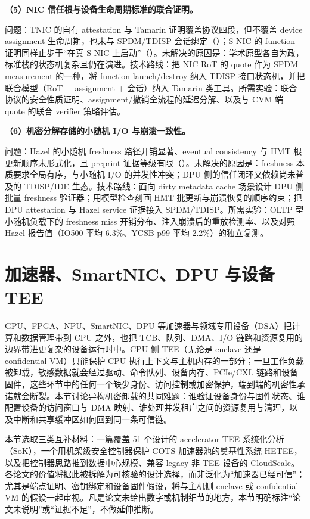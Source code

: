 \documentclass[11pt]{ctexart}
\begin{document}
\noindent\textbf{（5）NIC 信任根与设备生命周期标准的联合证明。}\par
问题：TNIC 的自有 attestation 与 Tamarin 证明覆盖协议四段，但不覆盖 device assignment 生命周期，也未与 SPDM/TDISP 会话绑定（\cite{giantsidi2025tnic}）；S-NIC 的 function 证明同样止步于“在真 S-NIC 上启动”（\cite{zhou2024snic}）。未解决的原因是：学术原型各自为政，标准栈的状态机复杂且仍在演进。技术路线：把 NIC RoT 的 quote 作为 SPDM measurement 的一种，将 function launch/destroy 纳入 TDISP 接口状态机，并把联合模型（RoT + assignment + 会话）纳入 Tamarin 类工具。所需实验：联合协议的安全性质证明、assignment/撤销全流程的延迟分解、以及与 CVM 端 quote 的联合 verifier 策略评估。\par
\noindent\textbf{（6）机密分解存储的小随机 I/O 与崩溃一致性。}\par
问题：Hazel 的小随机 freshness 路径开销显著、eventual consistency 与 HMT 根更新顺序未形式化，且 preprint 证据等级有限（\cite{chrapek2026hazel}）。未解决的原因是：freshness 本质要求全局有序，与小随机 I/O 的并发性冲突；DPU 侧的信任闭环又依赖尚未普及的 TDISP/IDE 生态。技术路线：面向 dirty metadata cache 场景设计 DPU 侧批量 freshness 验证器；用模型检查刻画 HMT 批更新与崩溃恢复的顺序约束；把 DPU attestation 与 Hazel service 证据接入 SPDM/TDISP。所需实验：OLTP 型小随机负载下的 freshness miss 开销分布、注入崩溃后的重放检测率、以及对照 Hazel 报告值（IO500 平均 6.3\%、YCSB p99 平均 2.2\%）的独立复测。\par
\section{加速器、SmartNIC、DPU 与设备 TEE}
GPU、FPGA、NPU、SmartNIC、DPU 等加速器与领域专用设备（DSA）把计算和数据管理带到 CPU 之外，也把 TCB、队列、DMA、I/O 链路和资源复用的边界带进更复杂的设备运行时中。CPU 侧 TEE（无论是 enclave 还是 confidential VM）只能保护 CPU 执行上下文与主机内存的一部分；一旦工作负载被卸载，敏感数据就会经过驱动、命令队列、设备内存、PCIe/CXL 链路和设备固件，这些环节中的任何一个缺少身份、访问控制或加密保护，端到端的机密性承诺就会断裂。本节讨论异构机密卸载的共同难题：谁验证设备身份与固件状态、谁配置设备的访问窗口与 DMA 映射、谁处理并发租户之间的资源复用与清理，以及中断和共享缓冲区如何回到同一条可信链。\par
本节选取三类互补材料：一篇覆盖 51 个设计的 accelerator TEE 系统化分析（SoK）\cite{sok-tee}，一个用机架级安全控制器保护 COTS 加速器池的奠基性系统 HETEE\cite{zhu2020hetee}，以及把控制器思路推到数据中心规模、兼容 legacy 非 TEE 设备的 CloudScale\cite{dhar2024cloudscale}。各论文的价值将据此被拆解为可核验的设计选择，而非泛化为``加速器已经可信''；尤其是端点证明、密钥绑定和设备固件假设，将与主机侧 enclave 或 confidential VM 的假设一起审视。凡是论文未给出数字或机制细节的地方，本节明确标注``论文未说明''或``证据不足''，不做延伸推断。\par
\end{document}

